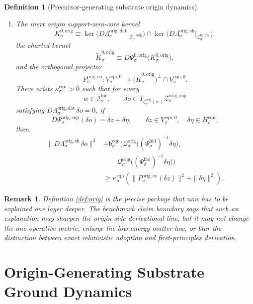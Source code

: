 \documentclass[11pt]{article}
\newcommand{\ForSpace}[1]{\mathcal I_{#1}^{\mathrm{for}}}
\newcommand{\HiddenChart}[1]{\Psi_{#1}^{\mathrm{hid}}}
\newcommand{\OrigData}[1]{\Lambda_{#1}^{\mathrm{orig,dat}}}
\newcommand{\OrigShellMap}[1]{\Lambda_{#1}^{\mathrm{orig,sh}}}
\newcommand{\OrigSupportShell}[1]{\mathcal Z_{#1}^{\mathrm{orig,sup}}}
\newcommand{\OrigZeroCore}[1]{\mathcal Z_{#1}^{0,\mathrm{orig}}}
\newcommand{\OrigEqChart}[1]{\Psi_{#1}^{\mathrm{orig,sup}}}
\newcommand{\OrigZeroChart}[1]{\Psi_{#1}^{0,\mathrm{orig}}}
\newcommand{\OrigCharge}[1]{\mathcal Q_{#1}^{\mathrm{orig}}}
\newcommand{\OrigEmbed}[1]{\zeta_{#1}^{\mathrm{orig}}}
\newcommand{\OrigKernel}[1]{K_{#1}^{0,\mathrm{orig}}}
\newcommand{\OrigKernelCh}[1]{\widetilde K_{#1}^{0,\mathrm{orig}}}
\newcommand{\OrigStateComp}[1]{P_{#1}^{\mathrm{orig,co}}}
\newcommand{\EqnPair}[1]{\mathfrak b_{#1}^{\mathrm{eqn}}}
\newcommand{\EqnHidden}[1]{H_{#1}^{\mathrm{eqn}}}
\newcommand{\EqnZero}[1]{V_{#1}^{\mathrm{eqn},0}}
\newtheorem{definition}{Definition}
\newtheorem{remark}{Remark}
\begin{document}
\begin{definition}[Precursor-generating substrate origin dynamics]
\begin{enumerate}
    \item The inert origin support-zero-core kernel
    \[
    \OrigKernel{\sigma}
    \equiv
    \ker\bigl(D\OrigData{\sigma}\big|_{\OrigZeroCore{\sigma}}\bigr)
    \cap
    \ker\bigl(D\OrigShellMap{\sigma}\big|_{\OrigZeroCore{\sigma}}\bigr),
    \]
    the charted kernel
    \[
    \OrigKernelCh{\sigma}
    \equiv
    D\OrigZeroChart{\sigma}\bigl(\OrigKernel{\sigma}\bigr),
    \]
    and the orthogonal projector
    \[
    \OrigStateComp{\sigma}:
    \EqnZero{\sigma}\to
    \bigl(\OrigKernelCh{\sigma}\bigr)^{\perp}\cap\EqnZero{\sigma}.
    \]
    There exists \(\kappa_{\sigma}^{\mathrm{eqn}}>0\) such that for every
    \[
    w\in\ForSpace{\sigma},
    \qquad
    \delta o\in T_{\OrigEmbed{\sigma}(w)}\OrigSupportShell{\sigma}
    \]
    satisfying \(D\OrigData{\sigma}\,\delta o=0\), if
    \[
    D\OrigEqChart{\sigma}(\delta o)=\delta z+\delta\eta,
    \qquad
    \delta z\in\EqnZero{\sigma},
    \quad
    \delta\eta\in\EqnHidden{\sigma},
    \]
    then
    \begin{equation}
    \begin{aligned}
    \|D\OrigShellMap{\sigma}\,\delta o\|^{2}
    &+
    \EqnPair{\sigma}\bigl(
    \OrigCharge{\sigma}\bigl((\HiddenChart{\sigma})^{-1}\delta\eta\bigr),\\
    &\qquad
    \OrigCharge{\sigma}\bigl((\HiddenChart{\sigma})^{-1}\delta\eta\bigr)
    \bigr)
    \\
    &\ge
    \kappa_{\sigma}^{\mathrm{eqn}}
    \left(
    \|\OrigStateComp{\sigma}(\delta z)\|^{2}
    +
    \|\delta\eta\|^{2}
    \right).
    \end{aligned}
    \label{eq:origcoercive}
    \end{equation}
\end{enumerate}
\end{definition}

\begin{remark}
Definition \ref{def:orig} is the precise package that now has to be explained one layer deeper. The benchmark claim boundary says that such an explanation may sharpen the origin-side derivational line, but it may not change the one operative metric, enlarge the low-energy matter law, or blur the distinction between exact relativistic adoption and first-principles derivation.
\end{remark}

\section{Origin-Generating Substrate Ground Dynamics}
\end{document}
